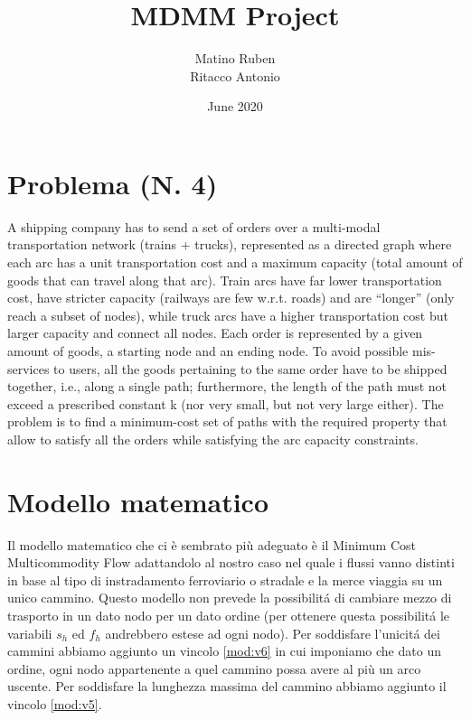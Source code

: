 \documentclass{article}
\title{MDMM Project}
\author{Matino Ruben \\ Ritacco Antonio }
\date{June 2020}
\begin{document}
\maketitle

\section{Problema (N. 4)}

A shipping company has to send a set of orders over a multi-modal transportation network (trains +
trucks), represented as a directed graph where each arc has a unit transportation cost and a
maximum capacity (total amount of goods that can travel along that arc). Train arcs have far lower
transportation cost, have stricter capacity (railways are few w.r.t. roads) and are “longer” (only
reach a subset of nodes), while truck arcs have a higher transportation cost but larger capacity and
connect all nodes. Each order is represented by a given amount of goods, a starting node and an
ending node. To avoid possible mis-services to users, all the goods pertaining to the same order
have to be shipped together, i.e., along a single path; furthermore, the length of the path must not
exceed a prescribed constant k (nor very small, but not very large either). The problem is to find a
minimum-cost set of paths with the required property that allow to satisfy all the orders while
satisfying the arc capacity constraints.


\section{Modello matematico}
Il modello matematico che ci è sembrato più adeguato è il Minimum Cost Multicommodity Flow adattandolo al nostro caso nel quale i flussi vanno distinti in base al tipo di instradamento ferroviario o stradale e la merce viaggia su un unico cammino. Questo modello non prevede la possibilit\'a di cambiare mezzo di trasporto in un dato nodo per un dato ordine (per ottenere questa possibilit\'a le variabili $s_h$ ed $f_h$ andrebbero estese ad ogni nodo). Per soddisfare l'unicit\'a dei cammini abbiamo aggiunto un vincolo \eqref{mod:v6} in cui imponiamo che dato un ordine, ogni nodo appartenente a quel cammino possa avere al più un arco uscente. Per soddisfare la lunghezza massima del cammino abbiamo aggiunto il vincolo \eqref{mod:v5}.
\end{document}

